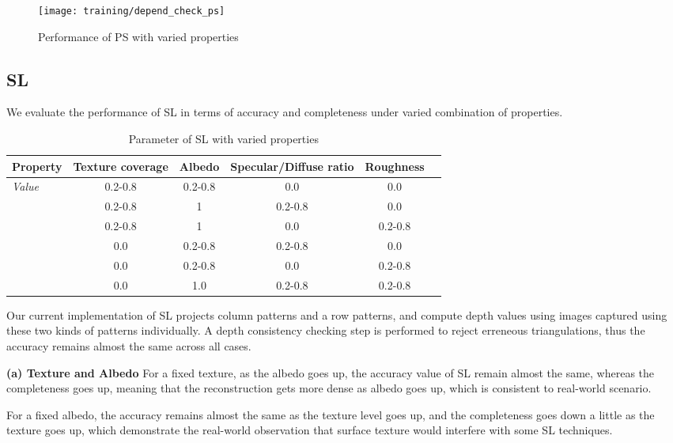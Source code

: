\begin{figure}[h!]
\texttt{[image: training/depend\_check\_ps]}
\caption{Performance of PS with varied properties}
\label{fig:depend_check_ps}
\end{figure}

\subsection{SL}
We evaluate the performance of SL in terms of accuracy and completeness under varied combination of properties.

\begin{table}[h]
  \centering
  \begin{tabular}{l*{5}{c}}
  \hline
  \textbf{Property} & Texture coverage & Albedo & Specular/Diffuse ratio & Roughness\\
  \hline
  \textit{Value} & 0.2-0.8 & 0.2-0.8 & 0.0 & 0.0\\
                 & 0.2-0.8 & 1 & 0.2-0.8 & 0.0\\
                 & 0.2-0.8 & 1 & 0.0 & 0.2-0.8\\
                 & 0.0 & 0.2-0.8 & 0.2-0.8 & 0.0\\
                 & 0.0 & 0.2-0.8 & 0.0 & 0.2-0.8\\
                 & 0.0 & 1.0 & 0.2-0.8 & 0.2-0.8\\
  \hline
  \end{tabular}
  \caption{Parameter of SL with varied properties}
\end{table}

Our current implementation of SL projects column patterns and a row patterns, and compute depth values using images captured using these two kinds of patterns individually. A depth consistency checking step is performed to reject erreneous triangulations, thus the accuracy remains almost the same across all cases.

\textbf{(a) Texture and Albedo} 
For a fixed texture, as the albedo goes up, the accuracy value of SL remain almost the same, whereas the completeness goes up, meaning that the reconstruction gets more dense as albedo goes up, which is consistent to real-world scenario.

For a fixed albedo, the accuracy remains almost the same as the texture level goes up, and the completeness goes down a little as the texture goes up, which demonstrate the real-world observation that surface texture would interfere with some SL techniques.

